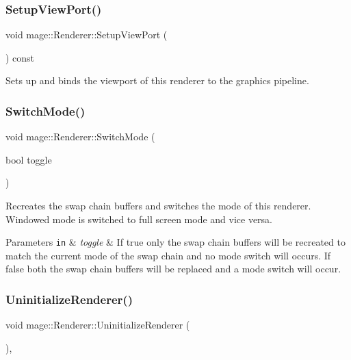\subsubsection{\texorpdfstring{Setup\+View\+Port()}{SetupViewPort()}}
{\footnotesize\ttfamily void mage\+::\+Renderer\+::\+Setup\+View\+Port (\begin{DoxyParamCaption}{ }\end{DoxyParamCaption}) const\hspace{0.3cm}{\ttfamily [private]}}

Sets up and binds the viewport of this renderer to the graphics pipeline. \hypertarget{classmage_1_1_renderer_a9004ab608659188900c808eacb5f873c}{}\label{classmage_1_1_renderer_a9004ab608659188900c808eacb5f873c} 
\subsubsection{\texorpdfstring{Switch\+Mode()}{SwitchMode()}}
{\footnotesize\ttfamily void mage\+::\+Renderer\+::\+Switch\+Mode (\begin{DoxyParamCaption}\item[{bool}]{toggle }\end{DoxyParamCaption})}

Recreates the swap chain buffers and switches the mode of this renderer. Windowed mode is switched to full screen mode and vice versa.


\begin{DoxyParams}[1]{Parameters}
\mbox{\tt in}  & {\em toggle} & If {\ttfamily true} only the swap chain buffers will be recreated to match the current mode of the swap chain and no mode switch will occurs. If {\ttfamily false} both the swap chain buffers will be replaced and a mode switch will occur. \\
\hline
\end{DoxyParams}
\hypertarget{classmage_1_1_renderer_a28c76b49e51e49e58fdeb0b72b12f3b6}{}\label{classmage_1_1_renderer_a28c76b49e51e49e58fdeb0b72b12f3b6} 
\subsubsection{\texorpdfstring{Uninitialize\+Renderer()}{UninitializeRenderer()}}
{\footnotesize\ttfamily void mage\+::\+Renderer\+::\+Uninitialize\+Renderer (\begin{DoxyParamCaption}{ }\end{DoxyParamCaption})\hspace{0.3cm}{\ttfamily [private]}, {\ttfamily [noexcept]}}

